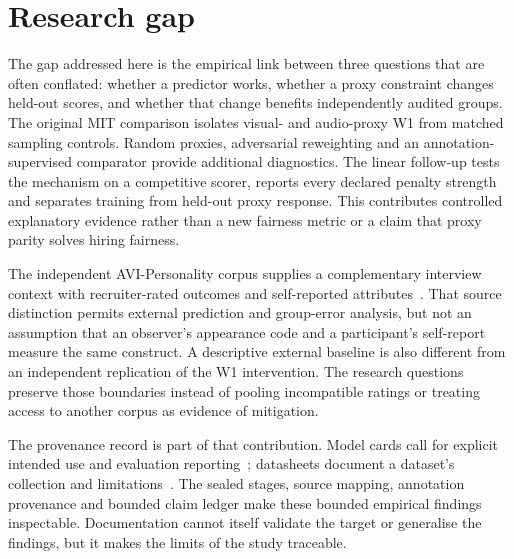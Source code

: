 \section{Research gap}

The gap addressed here is the empirical link between three questions that are often
conflated: whether a predictor works, whether a proxy constraint changes held-out scores,
and whether that change benefits independently audited groups. The original MIT
comparison isolates visual- and audio-proxy W1 from matched sampling controls. Random
proxies, adversarial reweighting and an annotation-supervised comparator provide
additional diagnostics. The linear follow-up tests the mechanism on a competitive
scorer, reports every declared penalty strength and separates training from held-out
proxy response. This contributes controlled explanatory evidence rather than a new
fairness metric or a claim that proxy parity solves hiring fairness.

The independent AVI-Personality corpus supplies a complementary interview context with
recruiter-rated outcomes and self-reported attributes~\cite{Zhang2026AVI}. That source
distinction permits external prediction and group-error analysis, but not an assumption
that an observer's appearance code and a participant's self-report measure the same
construct. A descriptive external baseline is also different from an independent
replication of the W1 intervention. The research questions preserve those boundaries
instead of pooling incompatible ratings or treating access to another corpus as
evidence of mitigation.

The provenance record is part of that contribution. Model cards call for explicit intended use
and evaluation reporting~\cite{Mitchell2019ModelCards}; datasheets document a dataset's
collection and limitations~\cite{Gebru2021Datasheets}. The sealed stages, source
mapping, annotation provenance and bounded claim ledger make these bounded empirical findings
inspectable. Documentation cannot itself validate the target or generalise the findings, but
it makes the limits of the study traceable.
